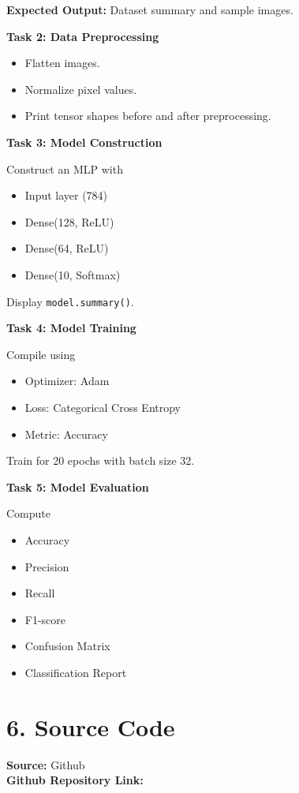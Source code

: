 \documentclass[11pt]{article}
\begin{document}
\textbf{Expected Output:}
Dataset summary and sample images.

\bigskip

\textbf{Task 2: Data Preprocessing}

\begin{itemize}
\item Flatten images.
\item Normalize pixel values.
\item Print tensor shapes before and after preprocessing.
\end{itemize}

\bigskip

\textbf{Task 3: Model Construction}

Construct an MLP with

\begin{itemize}
\item Input layer (784)
\item Dense(128, ReLU)
\item Dense(64, ReLU)
\item Dense(10, Softmax)
\end{itemize}

Display \texttt{model.summary()}.

\bigskip

\textbf{Task 4: Model Training}

Compile using

\begin{itemize}
\item Optimizer: Adam
\item Loss: Categorical Cross Entropy
\item Metric: Accuracy
\end{itemize}

Train for 20 epochs with batch size 32.

\bigskip

\textbf{Task 5: Model Evaluation}

Compute

\begin{itemize}
\item Accuracy
\item Precision
\item Recall
\item F1-score
\item Confusion Matrix
\item Classification Report
\end{itemize}

\section*{6. Source Code}
\noindent\textbf{Source:} Github\\
\noindent\textbf{Github Repository Link:}
\end{document}
